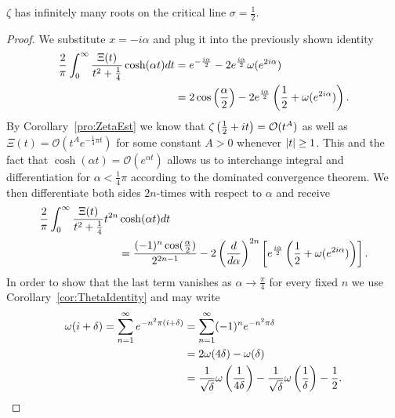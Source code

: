 \begin{theorem}
	$\zeta$ has infinitely many roots on the critical line $\sigma = \frac{1}{2}$.
\end{theorem}
\begin{proof}
	We substitute $x = -i \alpha$ and plug it into the previously shown identity
\begin{equation*}
\begin{aligned}
	\frac{2}{\pi} \int _0 ^{\infty} \frac{\Xi(t)}{t^2 + \frac{1}{4}} \cosh(\alpha t) dt 
	&= e^{-\frac{i \alpha}{2}} - 2e^{\frac{i \alpha}{2}} \omega(e^{2 i \alpha}) \\
	&= 2 \cos\left(\frac{\alpha}{2}\right) - 2e^{\frac{i \alpha}{2}} \left(\frac{1}{2} + \omega(e^{2 i \alpha})\right).
\end{aligned}
\end{equation*}
	By Corollary~\ref{pro:ZetaEst} we know that $\zeta\left(\frac{1}{2} + it\right) = \mathcal{O}(t^A)$ as well as $\Xi(t) = \mathcal{O}(t^A e^{-\frac{1}{4} \pi t})$ for some constant $A > 0$ whenever $\left|t\right| \geq 1$. This and the fact that $\cosh(\alpha t) = \mathcal{O}(e^{\alpha t})$ allows us to interchange integral and differentiation for $\alpha < \frac{1}{4} \pi$ according to the dominated convergence theorem. We then differentiate both sides $2n$-times with respect to $\alpha$ and receive
\begin{equation*}
\begin{aligned}	
	\frac{2}{\pi} \int _0 ^{\infty} \frac{\Xi(t)}{t^2 + \frac{1}{4}} t^{2n}
		&\cosh(\alpha t) dt \\
		&= \frac{(-1)^{n} \cos(\frac{\alpha}{2})}{2^{2n - 1}} - 2 \left(\frac{d}{d\alpha}\right)^{2n} \left[e^{\frac{i \alpha}{2}} \left(\frac{1}{2} + \omega(e^{2 i \alpha})\right)\right].
\end{aligned}
\end{equation*}
	In order to show that the last term vanishes as $\alpha \to \frac{\pi}{4}$ for every fixed $n$ we use Corollary~\ref{cor:ThetaIdentity} and may write
\begin{equation*}
\begin{aligned}
	\omega(i + \delta) = \sum _{n=1} ^{\infty} e^{-n^2 \pi (i + \delta)}
		&= \sum _{n=1} ^{\infty} (-1)^n e^{-n^2 \pi \delta} \\
		&= 2 \omega(4 \delta) - \omega(\delta) \\
		&= \frac{1}{\sqrt \delta} \omega\left(\frac{1}{4\delta}\right) - \frac{1}{\sqrt \delta} \omega\left(\frac{1}{\delta}\right) - \frac{1}{2}.
\end{aligned}
\end{equation*}

\end{proof}
